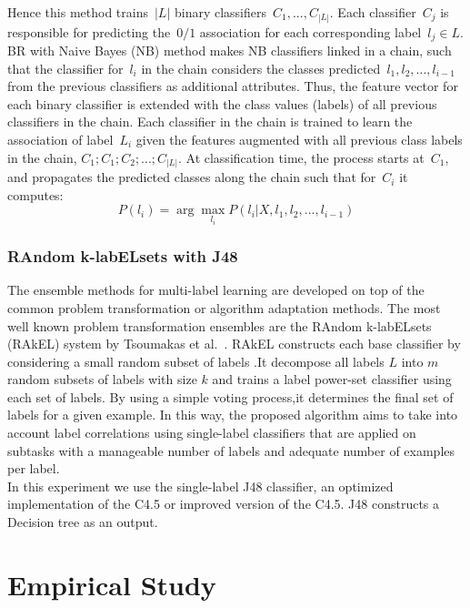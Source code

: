 \documentclass[11pt]{article}
\begin{document}
Hence this method trains~$|L|$ binary classifiers~$C_1,...,C_{|L|}$. Each classifier~$C_j$ is responsible for predicting the~$0/1$ association for each corresponding label~$l_j \in L$.\\

BR with Naive Bayes (NB) method makes NB classifiers linked in a chain, such that the classifier for~$l_{i}$ in the chain considers the classes predicted~$l_1,l_2,...,l_{i-1}$ from the previous classifiers as additional attributes. Thus, the feature vector for each binary classifier is extended with the class values (labels) of all previous classifiers in the chain. Each classifier in the chain is trained to learn the association of label~$L_i$
given the features augmented with all previous class labels in the chain, $ C_1;C_1;C_2;...;C_{|L|}$. At classification time, the process starts at~$C_1$, and propagates the predicted classes along   the   chain   such   that   for~$C_i$ it   computes: 
\begin{equation}
P(l_i)= \arg \max_{l_i} P(l_i|X,l_1,l_2,...,l_{i-1}) 
\end{equation}

\subsubsection{RAndom k-labELsets with J48}
The ensemble methods for multi-label learning are developed on top of the common problem transformation or algorithm adaptation methods. The most well known problem transformation ensembles are the RAndom k-labELsets (RAkEL) system by Tsoumakas et al.~\cite{Tsoumakas2011random}. RAkEL constructs each base classifier by considering a small random subset of labels .It decompose all labels $L$ into $m$ random subsets of labels
with size $k$ and trains a label power-set classifier
using each set of labels. By using a simple voting process,it  determines the
final set of labels for a given example. In this way, the proposed algorithm aims to take into account label correlations using single-label classifiers that are applied on subtasks with a manageable number of labels and adequate number of examples per label. \\

In this experiment we use the single-label J48 classifier, an optimized  implementation of the  C4.5 or improved version of the  C4.5. J48 constructs a Decision tree as an output.  

\section{Empirical Study}
\end{document}
